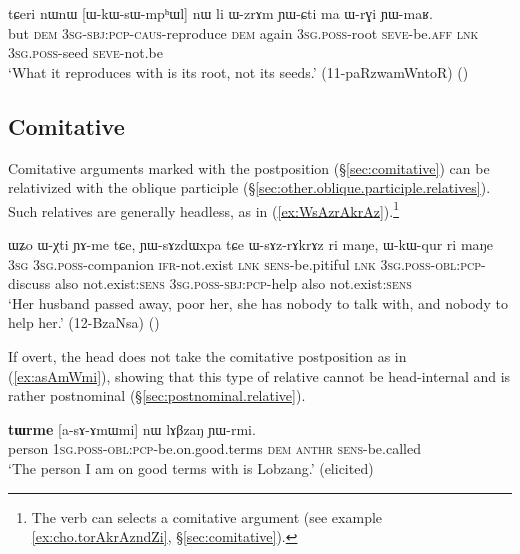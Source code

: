 \begin{exe}
\ex \label{ex:WkWsWmphWl}
\gll tɕeri nɯnɯ [ɯ-kɯ-sɯ-mpʰɯl] nɯ li ɯ-zrɤm ɲɯ-ɕti ma ɯ-rɣi ɲɯ-maʁ.  \\
but \textsc{dem} \textsc{3sg}-\textsc{sbj}:\textsc{pcp}-\textsc{caus}-reproduce \textsc{dem} again \textsc{3sg}.\textsc{poss}-root \textsc{seve}-be.\textsc{aff} \textsc{lnk} \textsc{3sg}.\textsc{poss}-seed \textsc{seve}-not.be \\
\glt `What it reproduces with is its root, not its seeds.' (11-paRzwamWntoR)
()
\end{exe}
 
\subsection{Comitative} \label{sec:comitative.relativization}
Comitative arguments marked with the postposition  (§\ref{sec:comitative}) can be relativized with the oblique participle (§\ref{sec:other.oblique.participle.relatives}). Such relatives are generally headless, as in (\ref{ex:WsAzrAkrAz}).\footnote{The verb  can selects a comitative argument (see example \ref{ex:cho.torAkrAzndZi}, §\ref{sec:comitative}). }

\begin{exe}
\ex \label{ex:WsAzrAkrAz}
\gll ɯʑo ɯ-χti ɲɤ-me tɕe, ɲɯ-sɤzdɯxpa tɕe ɯ-sɤz-rɤkrɤz ri maŋe, ɯ-kɯ-qur ri maŋe \\
 \textsc{3sg} \textsc{3sg}.\textsc{poss}-companion \textsc{ifr}-not.exist \textsc{lnk} \textsc{sens}-be.pitiful \textsc{lnk} \textsc{3sg}.\textsc{poss}-\textsc{obl}:\textsc{pcp}-discuss also not.exist:\textsc{sens} \textsc{3sg}.\textsc{poss}-\textsc{sbj}:\textsc{pcp}-help also not.exist:\textsc{sens} \\
\glt `Her husband passed away, poor her, she has nobody to talk with, and nobody to help her.' (12-BzaNsa)
()
\end{exe}

If overt, the head does not take the comitative postposition  as in (\ref{ex:asAmWmi}), showing that this type of relative cannot be head-internal and is rather postnominal (§\ref{sec:postnominal.relative}).

\begin{exe}
\ex \label{ex:asAmWmi}
\gll \textbf{tɯrme} [a-sɤ-ɤmɯmi] nɯ lɤβzaŋ ɲɯ-rmi. \\
person \textsc{1sg}.\textsc{poss}-\textsc{obl}:\textsc{pcp}-be.on.good.terms \textsc{dem}  \textsc{anthr} \textsc{sens}-be.called \\
\glt `The person I am on good terms with is Lobzang.' (elicited)
\end{exe}


